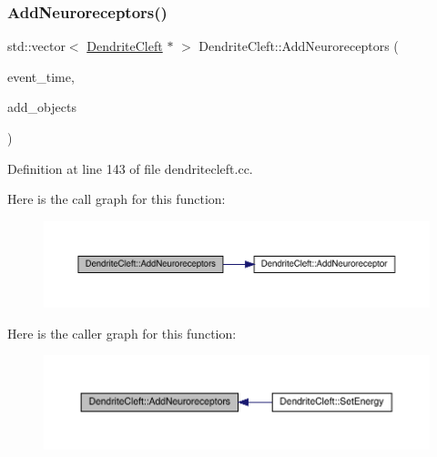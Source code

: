 \subsubsection{\texorpdfstring{Add\+Neuroreceptors()}{AddNeuroreceptors()}}
{\footnotesize\ttfamily std\+::vector$<$ \hyperlink{class_dendrite_cleft}{Dendrite\+Cleft} $\ast$ $>$ Dendrite\+Cleft\+::\+Add\+Neuroreceptors (\begin{DoxyParamCaption}\item[{std\+::chrono\+::time\+\_\+point$<$ \hyperlink{universe_8h_a0ef8d951d1ca5ab3cfaf7ab4c7a6fd80}{Clock} $>$}]{event\+\_\+time,  }\item[{std\+::vector$<$ \hyperlink{class_dendrite_cleft}{Dendrite\+Cleft} $\ast$$>$}]{add\+\_\+objects }\end{DoxyParamCaption})}



Definition at line 143 of file dendritecleft.\+cc.

Here is the call graph for this function\+:\nopagebreak
\begin{figure}[H]
\begin{center}
\leavevmode
\includegraphics[width=350pt]{class_dendrite_cleft_a6d29f577ff12366f8f51804b13468395_cgraph}
\end{center}
\end{figure}
Here is the caller graph for this function\+:\nopagebreak
\begin{figure}[H]
\begin{center}
\leavevmode
\includegraphics[width=350pt]{class_dendrite_cleft_a6d29f577ff12366f8f51804b13468395_icgraph}
\end{center}
\end{figure}
\mbox{\label{class_dendrite_cleft_a7650e1115baab30729da0b03a48da851}} 
